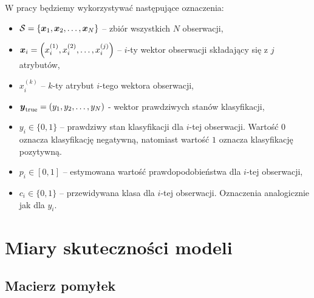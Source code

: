 \documentclass[inzynierska]{pwr_wmat_praca_dyplomowa}
\theoremstyle{plain}
\numberwithin{theorem}{chapter}
\theoremstyle{definition}
\numberwithin{theorem}{chapter}
\begin{document}
W pracy będziemy wykorzystywać następujące oznaczenia:
\begin{itemize}
	\item $\mathcal{S} = \{\boldsymbol{x}_1, \boldsymbol{x}_2, \dots, \boldsymbol{x}_N \}$ -- zbiór wszystkich $N$ obserwacji,
	\item $\boldsymbol{x}_{i} = \left(x_i^{(1)}, x_i^{(2)}, \dots, x_i^{(j)} \right)$ -- $i$-ty wektor obserwacji składający się z $j$ atrybutów,
	\item $x_i^{(k)}$ -- $k$-ty atrybut $i$-tego wektora obserwacji,
	\item $\boldsymbol{y}_{\text{true}} = (y_1, y_2, \dots, y_N)$ - wektor prawdziwych stanów klasyfikacji,
	\item $y_i \in \{0,1\}$ -- prawdziwy stan klasyfikacji dla $i$-tej obserwacji. Wartość $0$ oznacza klasyfikację negatywną, natomiast wartość $1$ oznacza klasyfikację pozytywną.
	\item $p_i \in [0,1]$ -- estymowana wartość prawdopodobieństwa dla $i$-tej obserwacji,
	\item $c_i \in \{0,1\} $ -- przewidywana klasa dla $i$-tej obserwacji. Oznaczenia analogicznie jak dla $y_i$.
\end{itemize}

\section{Miary skuteczności modeli}

\subsection{Macierz pomyłek}
\end{document}

